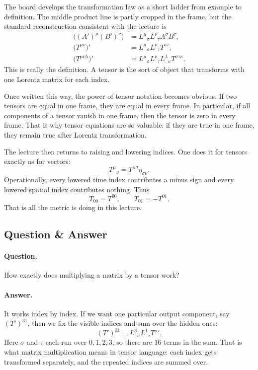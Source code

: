 The board develops the transformation law as a short ladder from example to definition. The middle product line is partly cropped in the frame, but the standard reconstruction consistent with the lecture is
\begin{align}
\bigl((A')^\mu(B')^\nu\bigr)
&=
L^\mu{}_\sigma L^\nu{}_\tau A^\sigma B^\tau,\\
\bigl(T^{\mu\nu}\bigr)'
&=
L^\mu{}_\sigma L^\nu{}_\tau T^{\sigma\tau},\\
\bigl(T^{\mu\nu\lambda}\bigr)'
&=
L^\mu{}_\sigma L^\nu{}_\tau L^\lambda{}_\kappa T^{\sigma\tau\kappa}.
\end{align}
This is really the definition. A tensor is the sort of object that transforms with one Lorentz matrix for each index.

Once written this way, the power of tensor notation becomes obvious. If two tensors are equal in one frame, they are equal in every frame. In particular, if all components of a tensor vanish in one frame, then the tensor is zero in every frame. That is why tensor equations are so valuable: if they are true in one frame, they remain true after Lorentz transformation.

The lecture then returns to raising and lowering indices. One does it for tensors exactly as for vectors:
\begin{equation}
T^\mu{}_\nu = T^{\mu\sigma}\eta_{\sigma\nu}.
\end{equation}
Operationally, every lowered time index contributes a minus sign and every lowered spatial index contributes nothing. Thus
\begin{equation}
T_{00}=T^{00},
\qquad
T_{01}=-T^{01}.
\end{equation}
That is all the metric is doing in this lecture.

\subsection{Question \& Answer}

\paragraph{Question.} How exactly does multiplying a matrix by a tensor work?

\paragraph{Answer.} It works index by index. If we want one particular output component, say $(T')^{31}$, then we fix the visible indices and sum over the hidden ones:
\begin{equation}
(T')^{31}=L^3{}_\sigma L^1{}_\tau T^{\sigma\tau}.
\end{equation}
Here $\sigma$ and $\tau$ each run over $0,1,2,3$, so there are $16$ terms in the sum. That is what matrix multiplication means in tensor language: each index gets transformed separately, and the repeated indices are summed over.

